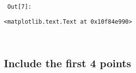 \documentclass{article}
\newlength{\inputpadding}
\newlength{\cellleftmargin}
\newlength{\smallerfontscale}
\def\smaller{\fontsize{\smallerfontscale}{\smallerfontscale}\selectfont}
\begin{document}
        {\par%
        \vspace{-1\smallerfontscale}%
        \noindent%
        \begin{minipage}{\cellleftmargin}%
    \hfill%
    {\smaller%
    \tt%
    \color{nbframe-out-prompt}%
    Out[7]:}%
    \hspace{\inputpadding}%
    \hspace{0em}%
    \hspace{3pt}%
    \end{minipage}%
        }%
    \begin{addmargin}[\cellleftmargin]{0em}%
    {\smaller%
    \vspace{-1\smallerfontscale}%
    
    
    
    \begin{verbatim}
<matplotlib.text.Text at 0x10f84e990>
    \end{verbatim}

    
}%
    \end{addmargin}%
    \begin{addmargin}[\cellleftmargin]{0em}%
    {\smaller%
    \vspace{-1\smallerfontscale}%
    
    \begin{center}
    \end{center}
    { \hspace*{\fill} \\}
    }%
    \end{addmargin}%
    \subsection{Include the first 4
points}\label{include-the-first-4-points}

\end{document}
